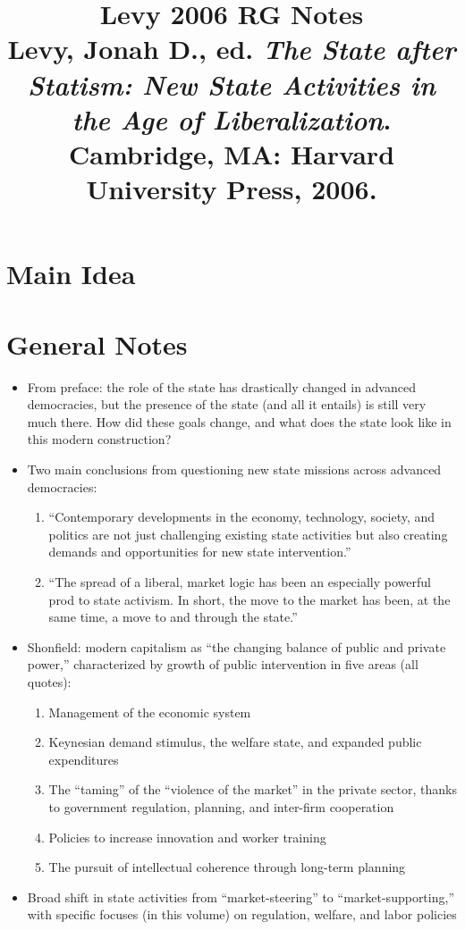 \documentclass[12pt]{article}
\title{\textbf{Levy 2006 RG Notes}\\
\large Levy, Jonah D., ed. \textit{The State after Statism: New State Activities in the Age of Liberalization}.\\
Cambridge, MA: Harvard University Press, 2006.}
\author{}
\date{}
\begin{document}
\maketitle

\section{Main Idea}



\section{General Notes}

\begin{itemize}[leftmargin=*, itemsep=4pt]
    \item From preface: the role of the state has drastically changed in advanced democracies, but the presence of the state (and all it entails) is still very much there. How did these goals change, and what does the state look like in this modern construction?
    \item Two main conclusions from questioning new state missions across advanced democracies:
    \begin{enumerate}
        \item ``Contemporary developments in the economy, technology, society, and politics are not just challenging existing state activities but also creating demands and opportunities for new state intervention.''
        \item ``The spread of a liberal, market logic has been an especially powerful prod to state activism. In short, the move to the market has been, at the same time, a move to and through the state.''
    \end{enumerate}
    \item Shonfield: modern capitalism as ``the changing balance of public and private power,'' characterized by growth of public intervention in five areas (all quotes):
    \begin{enumerate}
        \item Management of the economic system
        \item Keynesian demand stimulus, the welfare state, and expanded public expenditures
        \item The ``taming'' of the ``violence of the market'' in the private sector, thanks to government regulation, planning, and inter-firm cooperation
        \item Policies to increase innovation and worker training
        \item The pursuit of intellectual coherence through long-term planning
    \end{enumerate}
    \item Broad shift in state activities from ``market-steering'' to ``market-supporting,'' with specific focuses (in this volume) on regulation, welfare, and labor policies
\end{itemize}
\end{document}
